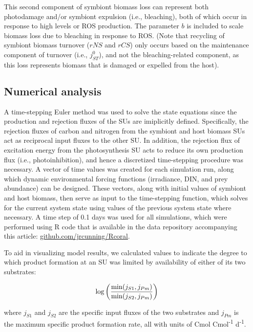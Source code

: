 \documentclass[]{elsarticle} %
\begin{document}
This second component of symbiont biomass loss can represent both
photodamage and/or symbiont expulsion (i.e., bleaching), both of which
occur in response to high levels or ROS production. The parameter \(b\)
is included to scale biomass loss due to bleaching in response to ROS.
(Note that recycling of symbiont biomass turnover (\(rNS\) and \(rCS\))
only occurs based on the maintenance component of turnover (i.e.,
\(j_{ST}^0\)), and not the bleaching-related component, as this loss
represents biomass that is damaged or expelled from the host).

\subsection{Numerical analysis}\label{numerical-analysis}

A time-stepping Euler method was used to solve the state equations since
the production and rejection fluxes of the SUs are imiplicitly defined.
Specifically, the rejection fluxes of carbon and nitrogen from the
symbiont and host biomass SUs act as reciprocal input fluxes to the
other SU. In addition, the rejection flux of excitation energy from the
photosynthesis SU acts to reduce its own production flux (i.e.,
photoinhibition), and hence a discretized time-stepping procedure was
necessary. A vector of time values was created for each simulation run,
along which dynamic environmental forcing functions (irradiance, DIN,
and prey abundance) can be designed. These vectors, along with initial
values of symbiont and host biomass, then serve as input to the
time-stepping function, which solves for the current system state using
values of the previous system state where necessary. A time step of 0.1
days was used for all simulations, which were performed using R code
that is available in the data repository accompanying this article:
\url{github.com/jrcunning/Rcoral}.

To aid in visualizing model results, we calculated values to indicate
the degree to which product formation at an SU was limited by
availability of either of its two substrates:

\begin{equation} \log \bigg({{\min(j_{S1}, j_{Pm})} \over {\min(j_{S2}, j_{Pm})}}\bigg) \end{equation}

where \(j_{S1}\) and \(j_{S2}\) are the specific input fluxes of the two
substrates and \(j_{Pm}\) is the maximum specific product formation
rate, all with units of Cmol Cmol\textsuperscript{-1}
d\textsuperscript{-1}.
\end{document}
